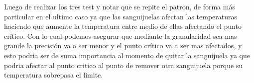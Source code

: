 Luego de realizar los tres test y notar que se repite el patron,  de forma más particular en el ultimo caso ya que las sanguijuelas afectan las temperaturas haciendo que aumente la temperatura entre medio de ellas afectando el punto crítico.
Con lo cual podemos asegurar que mediante la granularidad sea mas grande la precisión va a ser menor y el punto crítico va a ser mas afectados, y esto podria ser de suma importancia al momento de quitar la sanguijuela ya que podria afectar al punto critico al punto de remover otra sanguijuela porque su temperatura sobrepasa el limite.









